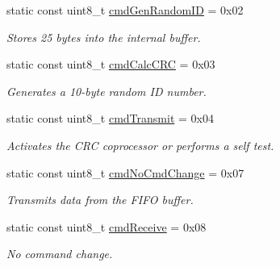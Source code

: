 \begin{DoxyCompactItemize}
\mbox{\label{classMFRC522_a5db2970d46d7b445af997cf42c036e27}} 
static const uint8\+\_\+t \hyperlink{classMFRC522_a5db2970d46d7b445af997cf42c036e27}{cmd\+Gen\+Random\+ID} = 0x02
\begin{DoxyCompactList}\small\item\em Stores 25 bytes into the internal buffer. \end{DoxyCompactList}\item 
\mbox{\label{classMFRC522_ac846a3bc11884b6ef2727b08bfa1597f}} 
static const uint8\+\_\+t \hyperlink{classMFRC522_ac846a3bc11884b6ef2727b08bfa1597f}{cmd\+Calc\+C\+RC} = 0x03
\begin{DoxyCompactList}\small\item\em Generates a 10-\/byte random ID number. \end{DoxyCompactList}\item 
\mbox{\label{classMFRC522_a583d65bc8e373170a37502a3db46ccee}} 
static const uint8\+\_\+t \hyperlink{classMFRC522_a583d65bc8e373170a37502a3db46ccee}{cmd\+Transmit} = 0x04
\begin{DoxyCompactList}\small\item\em Activates the C\+RC coprocessor or performs a self test. \end{DoxyCompactList}\item 
\mbox{\label{classMFRC522_a9da4cae4ffc7a4ee4704660d1a63c78d}} 
static const uint8\+\_\+t \hyperlink{classMFRC522_a9da4cae4ffc7a4ee4704660d1a63c78d}{cmd\+No\+Cmd\+Change} = 0x07
\begin{DoxyCompactList}\small\item\em Transmits data from the F\+I\+FO buffer. \end{DoxyCompactList}\item 
\mbox{\label{classMFRC522_a45174d03bf2ae78cffed9e2d94b78343}} 
static const uint8\+\_\+t \hyperlink{classMFRC522_a45174d03bf2ae78cffed9e2d94b78343}{cmd\+Receive} = 0x08
\begin{DoxyCompactList}\small\item\em No command change. \end{DoxyCompactList}\item 
\mbox{\label{classMFRC522_afecac251dc4b33d217f9c606d1e72b6d}} 

\end{DoxyCompactItemize}
